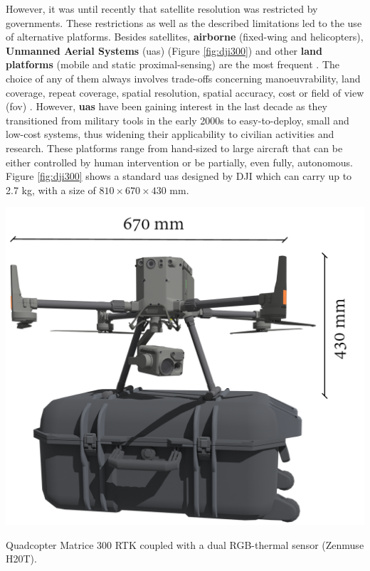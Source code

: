 However, it was until recently that satellite resolution was restricted by governments. These restrictions as well as the described limitations led to the use of alternative platforms. Besides satellites, \textbf{airborne} (fixed-wing and helicopters), \textbf{Unmanned Aerial Systems} (\acrshort{uas}) (Figure \ref{fig:dji300}) and other \textbf{land platforms} (mobile and static proximal-sensing) are the most frequent \cite{lillesand_remote_2015}. The choice of any of them always involves trade-offs concerning manoeuvrability, land coverage, repeat coverage, spatial resolution, spatial accuracy, cost or field of view (\acrshort{fov}) \cite{toth_remote_2016}. However, \textbf{\acrshort{uas}} have been gaining interest in the last decade as they transitioned from military tools in the early 2000s to easy-to-deploy, small and low-cost systems, thus widening their applicability to civilian activities and research. These platforms range from hand-sized to large aircraft that can be either controlled by human intervention or be partially, even fully, autonomous. Figure \ref{fig:dji300} shows a standard \acrshort{uas} designed by DJI which can carry up to 2.7 \si{\kilo\gram}, with a size of $810 \times 670 \times 430$ \si{\milli\meter}.
\begin{marginfigure}[-3cm]
	\includegraphics{figs/introduction/dji300.png}
	\caption{Quadcopter Matrice 300 RTK coupled with a dual RGB-thermal sensor (Zenmuse H20T). }
	\label{fig:dji300}
\end{marginfigure}


